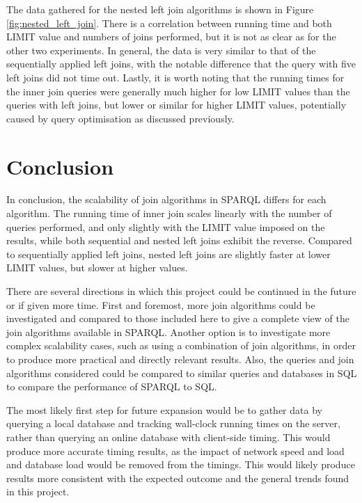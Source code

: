\documentclass[10pt,a4paper]{article}
\begin{document}
	The data gathered for the nested left join algorithms is shown in Figure \ref{fig:nested_left_join}. There is a correlation between running time and both LIMIT value and numbers of joins performed, but it is not as clear as for the other two experiments. In general, the data is very similar to that of the sequentially applied left joins, with the notable difference that the query with five left joins did not time out. Lastly, it is worth noting that the running times for the inner join queries were generally much higher for low LIMIT values than the queries with left joins, but lower or similar for higher LIMIT values, potentially caused by query optimisation as discussed previously.

	\section*{Conclusion}
	
	In conclusion, the scalability of join algorithms in SPARQL differs for each algorithm. The running time of inner join scales linearly with the number of queries performed, and only slightly with the LIMIT value imposed on the results, while both sequential and nested left joins exhibit the reverse. Compared to sequentially applied left joins, nested left joins are slightly faster at lower LIMIT values, but slower at higher values.
	
	There are several directions in which this project could be continued in the future or if given more time. First and foremost, more join algorithms could be investigated and compared to those included here to give a complete view of the join algorithms available in SPARQL. Another option is to investigate more complex scalability cases, such as using a combination of join algorithms, in order to produce more practical and directly relevant results. Also, the queries and join algorithms considered could be compared to similar queries and databases in SQL to compare the performance of SPARQL to SQL.
	
	The most likely first step for future expansion would be to gather data by querying a local database and tracking wall-clock running times on the server, rather than querying an online database with client-side timing. This would produce more accurate timing results, as the impact of network speed and load and database load would be removed from the timings. This would likely produce results more consistent with the expected outcome and the general trends found in this project.
	
\end{document}
